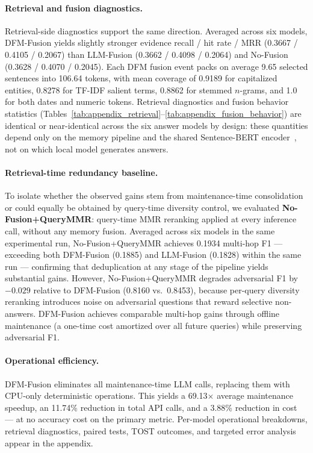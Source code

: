\paragraph{Retrieval and fusion diagnostics.}
Retrieval-side diagnostics support the same direction. Averaged across six models, DFM-Fusion yields slightly stronger evidence recall / hit rate / MRR (0.3667 / 0.4105 / 0.2067) than LLM-Fusion (0.3662 / 0.4098 / 0.2064) and No-Fusion (0.3628 / 0.4070 / 0.2045). Each DFM fusion event packs on average 9.65 selected sentences into 106.64 tokens, with mean coverage of 0.9189 for capitalized entities, 0.8278 for TF-IDF salient terms, 0.8862 for stemmed $n$-grams, and 1.0 for both dates and numeric tokens. Retrieval diagnostics and fusion behavior statistics (Tables~\ref{tab:appendix_retrieval}--\ref{tab:appendix_fusion_behavior}) are identical or near-identical across the six answer models by design: these quantities depend only on the memory pipeline and the shared Sentence-BERT encoder~\citep{Reimers2019SentenceBERTSE}, not on which local model generates answers.

\paragraph{Retrieval-time redundancy baseline.}
To isolate whether the observed gains stem from maintenance-time consolidation or could equally be obtained by query-time diversity control, we evaluated \textbf{No-Fusion+QueryMMR}: query-time MMR reranking applied at every inference call, without any memory fusion.
Averaged across six models in the same experimental run, No-Fusion+QueryMMR achieves 0.1934 multi-hop F1 --- exceeding both DFM-Fusion (0.1885) and LLM-Fusion (0.1828) within the same run --- confirming that deduplication at any stage of the pipeline yields substantial gains.
However, No-Fusion+QueryMMR degrades adversarial F1 by $-0.029$ relative to DFM-Fusion (0.8160 vs.\ 0.8453), because per-query diversity reranking introduces noise on adversarial questions that reward selective non-answers.
DFM-Fusion achieves comparable multi-hop gains through offline maintenance (a one-time cost amortized over all future queries) while preserving adversarial F1.

\paragraph{Operational efficiency.}
DFM-Fusion eliminates all maintenance-time LLM calls, replacing them with CPU-only deterministic operations. This yields a 69.13$\times$ average maintenance speedup, an 11.74\% reduction in total API calls, and a 3.88\% reduction in cost --- at no accuracy cost on the primary metric. Per-model operational breakdowns, retrieval diagnostics, paired tests, TOST outcomes, and targeted error analysis appear in the appendix.

